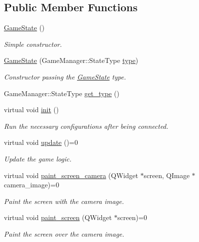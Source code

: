 \subsection*{Public Member Functions}
\begin{DoxyCompactItemize}
\item 
\hyperlink{class_game_state_a4fa0a2bf50315c4a35a3890a0adcee5c}{Game\-State} ()
\begin{DoxyCompactList}\small\item\em Simple constructor. \end{DoxyCompactList}\item 
\hypertarget{class_game_state_a428a39433507456ddd6304c07ec80075}{\hyperlink{class_game_state_a428a39433507456ddd6304c07ec80075}{Game\-State} (Game\-Manager\-::\-State\-Type \hyperlink{class_game_state_afc2d4395529e7ecba05379a8f5f224c5}{type})}\label{class_game_state_a428a39433507456ddd6304c07ec80075}

\begin{DoxyCompactList}\small\item\em Constructor passing the \hyperlink{class_game_state}{Game\-State} type. \end{DoxyCompactList}\item 
Game\-Manager\-::\-State\-Type \hyperlink{class_game_state_ae04e587d59e6f2cba6dddd95faabc734}{get\-\_\-type} ()
\item 
\hypertarget{class_game_state_aa850839f1d8c80b185c3ba944a2c95fd}{virtual void \hyperlink{class_game_state_aa850839f1d8c80b185c3ba944a2c95fd}{init} ()}\label{class_game_state_aa850839f1d8c80b185c3ba944a2c95fd}

\begin{DoxyCompactList}\small\item\em Run the necessary configurations after being connected. \end{DoxyCompactList}\item 
virtual void \hyperlink{class_game_state_ab2864bfa04f92f6966861a1f2883bda0}{update} ()=0
\begin{DoxyCompactList}\small\item\em Update the game logic. \end{DoxyCompactList}\item 
virtual void \hyperlink{class_game_state_aac32d423dd6ebe9c1dbbf4c02b1b8d61}{paint\-\_\-screen\-\_\-camera} (Q\-Widget $\ast$screen, Q\-Image $\ast$camera\-\_\-image)=0
\begin{DoxyCompactList}\small\item\em Paint the screen with the camera image. \end{DoxyCompactList}\item 
virtual void \hyperlink{class_game_state_a3ea5432d8db8538bc18ab4cf0fdfc871}{paint\-\_\-screen} (Q\-Widget $\ast$screen)=0
\begin{DoxyCompactList}\small\item\em Paint the screen over the camera image. \end{DoxyCompactList}\end{DoxyCompactItemize}
